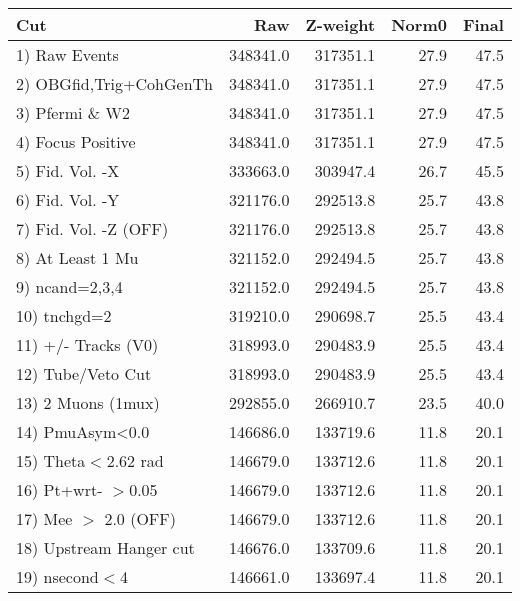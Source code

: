  \begin{table}[h!]\centering
 \begin{tabular}{||l||r|r|r|r||}
 \hline
 \hline
 Cut & Raw & Z-weight & Norm0 & Final \\
 \hline
  1) Raw Events           &    348341.0 &    317351.1 &        27.9 &        47.5 \\
  2) OBGfid,Trig+CohGenTh &    348341.0 &    317351.1 &        27.9 &        47.5 \\
  3) Pfermi \& W2         &    348341.0 &    317351.1 &        27.9 &        47.5 \\
  4) Focus Positive       &    348341.0 &    317351.1 &        27.9 &        47.5 \\
  5) Fid. Vol. -X         &    333663.0 &    303947.4 &        26.7 &        45.5 \\
  6) Fid. Vol. -Y         &    321176.0 &    292513.8 &        25.7 &        43.8 \\
  7) Fid. Vol. -Z (OFF)   &    321176.0 &    292513.8 &        25.7 &        43.8 \\
  8) At Least 1 Mu        &    321152.0 &    292494.5 &        25.7 &        43.8 \\
  9) ncand=2,3,4          &    321152.0 &    292494.5 &        25.7 &        43.8 \\
 10) tnchgd=2             &    319210.0 &    290698.7 &        25.5 &        43.4 \\
 11) +/- Tracks (V0)      &    318993.0 &    290483.9 &        25.5 &        43.4 \\
 12) Tube/Veto Cut        &    318993.0 &    290483.9 &        25.5 &        43.4 \\
 13) 2 Muons (1mux)       &    292855.0 &    266910.7 &        23.5 &        40.0 \\
 14) PmuAsym<0.0          &    146686.0 &    133719.6 &        11.8 &        20.1 \\
 15) Theta$<$2.62 rad     &    146679.0 &    133712.6 &        11.8 &        20.1 \\
 16) Pt+wrt- $>$0.05      &    146679.0 &    133712.6 &        11.8 &        20.1 \\
 17) Mee $>$ 2.0  (OFF)   &    146679.0 &    133712.6 &        11.8 &        20.1 \\
 18) Upstream Hanger cut  &    146676.0 &    133709.6 &        11.8 &        20.1 \\
 19) nsecond$<$4          &    146661.0 &    133697.4 &        11.8 &        20.1 \\

\end{tabular}
\end{table}
